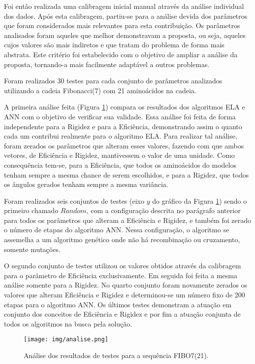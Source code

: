 \documentclass[dm,ppgcomp]{texfurg}
\begin{document}
Foi então realizada uma calibragem inicial manual através da análise individual dos dados. Após esta calibragem, partiu-se para a análise devida dos parâmetros que foram considerados mais relevantes para esta contribuição. Os parâmetros analisados foram aqueles que melhor demonstravam a proposta, ou seja, aqueles cujos valores são mais indiretos e que tratam do problema de forma mais abstrata. Este critério foi estabelecido com o objetivo de ampliar a análise da proposta, tornando-a mais facilmente adaptável a outros problemas. 

Foram realizados 30 testes para cada conjunto de parâmetros analizados utilizando a cadeia Fibonacci(7) com 21 aminoácidos na cadeia. 

A primeira análise feita (Figura \ref{analise}) compara os resultados dos algoritmos ELA e ANN com o objetivo de verificar sua validade. Essa análise foi feita de forma independente para a Rigidez e para a Eficiência, demonstrando assim o quanto cada um contribui realmente para o algoritmo ELA. Para realizar tal análise, foram zerados os parâmetros que alteram esses valores, fazendo com que ambos vetores, de Eficiência e Rigidez, mantivessem o valor de uma unidade. Como consequência tem-se, para a Eficiência, que todos os aminoácidos do modelos tenham sempre a mesma chance de serem escolhidos, e para a Rigidez, que todos os ângulos gerados tenham sempre a mesma variância.  

Foram realizados seis conjuntos de testes (eixo $y$ do gráfico da Figura \ref{analise}) sendo o primeiro chamado $Random$, com a configuração descrita no parágrafo anterior para todos os parâmetros que alteram a Eficiência e Rigidez, e também foi zerado o número de etapas do algoritmo ANN. Nessa configuração, o algoritmo se assemelha a um algoritmo genético onde não há recombinação ou cruzamento, somente mutações.

O segundo conjunto de testes utilizou os valores obtidos através da calibragem para o parâmetro de Eficiência exclusivamente. Em seguida foi feita a mesma análise somente para a Rigidez. No quarto conjunto foram novamente zerados os valores que alteram Eficiência e Rigidez e determinou-se um número fixo de 200 etapas para o algoritmo ANN. Os últimos testes demonstram a atuação em conjunto dos conceitos de Eficiência e Rigidez e por fim a atuação conjunta de todos os algoritmos na busca pela solução.

\begin{figure}[htbp]
  \centering \texttt{[image: img/analise.png]}
\caption{Análise dos resultados de testes para a sequência FIBO7(21).} 
\label{analise}
\end{figure}
  
\end{document}
